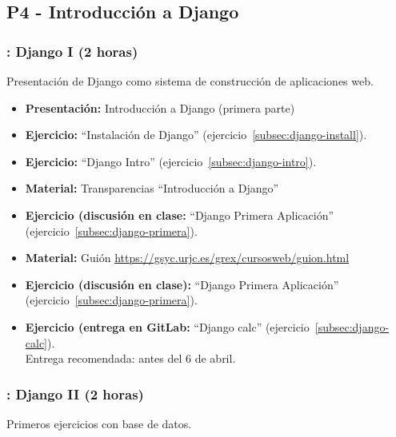 \documentclass[a4paper,12pt]{article}
\begin{document}
\subsection{P4 - Introducción a Django}

\subsubsection{\lunesF: Django I (2 horas)}
\label{cal:lunesF}

Presentación de Django como sistema de construcción de aplicaciones web.

\begin{itemize}
 \item \textbf{Presentación:} Introducción a Django (primera parte)
 \item \textbf{Ejercicio:} ``Instalación de Django'' (ejercicio~\ref{subsec:django-install}).
 \item \textbf{Ejercicio:} ``Django Intro'' (ejercicio~\ref{subsec:django-intro}).
 \item \textbf{Material:} Transparencias ``Introducción a Django''
 \item \textbf{Ejercicio (discusión en clase:} ``Django Primera Aplicación'' (ejercicio~\ref{subsec:django-primera}).
 \item \textbf{Material:} Guión \url{https://gsyc.urjc.es/grex/cursosweb/guion.html}
 \item \textbf{Ejercicio (discusión en clase):} ``Django Primera Aplicación'' (ejercicio~\ref{subsec:django-primera}).

  \item \textbf{Ejercicio (entrega en GitLab:} ``Django calc'' (ejercicio~\ref{subsec:django-calc}). \\
    Entrega recomendada: antes del 6 de abril.
\end{itemize}


\subsubsection{\lunesG: Django II (2 horas)}
\label{cal:lunesG}

Primeros ejercicios con base de datos.
\end{document}
